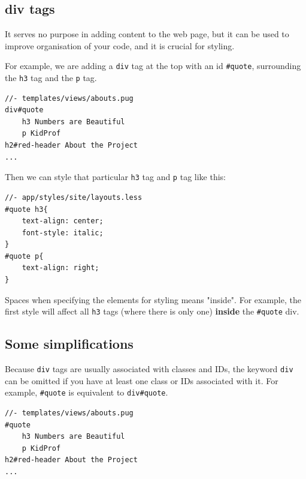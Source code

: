 \subsection{div tags}

It serves no purpose in adding content to the web page, but it can be used to improve organisation of your code, and it is crucial for styling. 

For example, we are adding a \texttt{div} tag at the top with an id \texttt{\#quote}, surrounding the \texttt{h3} tag and the \texttt{p} tag.
\vspace{6mm}

\begin{lstlisting}[language=pug]
//- templates/views/abouts.pug
div#quote
    h3 Numbers are Beautiful
    p KidProf
h2#red-header About the Project
...
\end{lstlisting}
\vspace{6mm}

Then we can style that particular \texttt{h3} tag and \texttt{p} tag like this:
\vspace{6mm}

\begin{lstlisting}[language=pug]
//- app/styles/site/layouts.less
#quote h3{
    text-align: center;
    font-style: italic;
}
#quote p{
    text-align: right;
}
\end{lstlisting}
\vspace{6mm}

Spaces when specifying the elements for styling means "inside". For example, the first style will affect all \texttt{h3} tags (where there is only one) \textbf{inside} the \texttt{\#quote} div.

\subsection*{Some simplifications}
Because \texttt{div} tags are usually associated with classes and IDs, the keyword \texttt{div} can be omitted if you have at least one class or IDs associated with it. For example, \texttt{\#quote} is equivalent to \texttt{div\#quote}.
\vspace{6mm}

\begin{lstlisting}[language=pug]
//- templates/views/abouts.pug
#quote
    h3 Numbers are Beautiful
    p KidProf
h2#red-header About the Project
...
\end{lstlisting}
\vspace{6mm}

